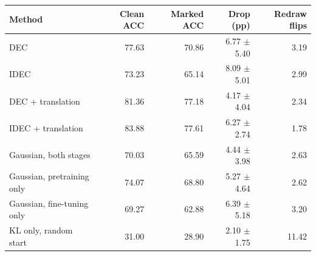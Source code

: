 \begin{tabular}{lrrrr}
\toprule
Method & Clean ACC & Marked ACC & Drop (pp) & Redraw flips\\
\midrule
DEC & 77.63 & 70.86 & 6.77 $\pm$ 5.40 & 3.19\\
IDEC & 73.23 & 65.14 & 8.09 $\pm$ 5.01 & 2.99\\
DEC + translation & 81.36 & 77.18 & 4.17 $\pm$ 4.04 & 2.34\\
IDEC + translation & 83.88 & 77.61 & 6.27 $\pm$ 2.74 & 1.78\\
Gaussian, both stages & 70.03 & 65.59 & 4.44 $\pm$ 3.98 & 2.63\\
Gaussian, pretraining only & 74.07 & 68.80 & 5.27 $\pm$ 4.64 & 2.62\\
Gaussian, fine-tuning only & 69.27 & 62.88 & 6.39 $\pm$ 5.18 & 3.20\\
KL only, random start & 31.00 & 28.90 & 2.10 $\pm$ 1.75 & 11.42\\
\bottomrule
\end{tabular}
